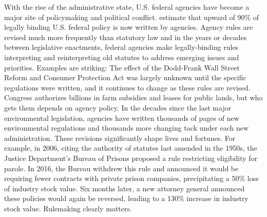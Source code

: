 With the rise of the administrative state, U.S. federal agencies have become a major site of policymaking and political conflict. \citet{West2013} estimate that upward of 90\% of legally binding U.S. federal policy is now written by agencies. Agency rules are revised much more frequently than statutory law \citep{Wagner2017} and in the years or decades between legislative enactments, federal agencies make legally-binding rules interpreting and reinterpreting old statutes to address emerging issues and priorities. %
Examples are striking: The effect of the Dodd-Frank Wall Street Reform and Consumer Protection Act was largely unknown until the specific regulations were written, and it continues to change as these rules are revised. 
Congress authorizes billions in farm subsidies and leases for public lands, but who gets them depends on agency policy. In the decades since the last major environmental legislation, agencies have written thousands of pages of new environmental regulations and thousands more changing tack under each new administration. These revisions significantly shape lives and fortunes. For example, in 2006, citing the authority of statutes last amended in the 1950s, the Justice Department's Bureau of Prisons proposed a rule restricting eligibility for parole. In 2016, the Bureau withdrew this rule and announced it would be requiring fewer contracts with private prison companies, precipitating a 50\% loss of industry stock value. Six months later, a new attorney general announced these policies would again be reversed, leading to a 130\% increase in industry stock value. %
Rulemaking clearly matters.

